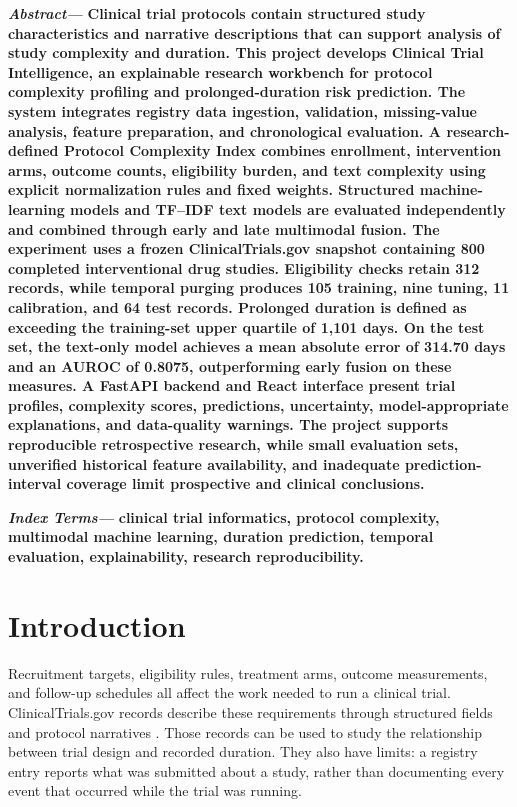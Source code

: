 \documentclass[10pt,letterpaper,twocolumn]{article}
\begin{document}
\noindent
{\bfseries\itshape Abstract—}
{\bfseries
Clinical trial protocols contain structured study characteristics and narrative descriptions that can support analysis of study complexity and duration. This project develops Clinical Trial Intelligence, an explainable research workbench for protocol complexity profiling and prolonged-duration risk prediction. The system integrates registry data ingestion, validation, missing-value analysis, feature preparation, and chronological evaluation. A research-defined Protocol Complexity Index combines enrollment, intervention arms, outcome counts, eligibility burden, and text complexity using explicit normalization rules and fixed weights. Structured machine-learning models and TF–IDF text models are evaluated independently and combined through early and late multimodal fusion.
The experiment uses a frozen ClinicalTrials.gov snapshot containing 800 completed interventional drug studies. Eligibility checks retain 312 records, while temporal purging produces 105 training, nine tuning, 11 calibration, and 64 test records. Prolonged duration is defined as exceeding the training-set upper quartile of 1,101 days. On the test set, the text-only model achieves a mean absolute error of 314.70 days and an AUROC of 0.8075, outperforming early fusion on these measures. A FastAPI backend and React interface present trial profiles, complexity scores, predictions, uncertainty, model-appropriate explanations, and data-quality warnings. The project supports reproducible retrospective research, while small evaluation sets, unverified historical feature availability, and inadequate prediction-interval coverage limit prospective and clinical conclusions.
}

\vspace{2pt}

\noindent
{\bfseries\itshape Index Terms—}
{\bfseries clinical trial informatics, protocol complexity, multimodal machine learning, duration prediction, temporal evaluation, explainability, research reproducibility.}

\vspace{8pt}

\section{Introduction}

Recruitment targets, eligibility rules, treatment arms, outcome measurements, and follow-up schedules all affect the work needed to run a clinical trial. ClinicalTrials.gov records describe these requirements through structured fields and protocol narratives \cite{clinicaltrials}. Those records can be used to study the relationship between trial design and recorded duration. They also have limits: a registry entry reports what was submitted about a study, rather than documenting every event that occurred while the trial was running.
\end{document}
